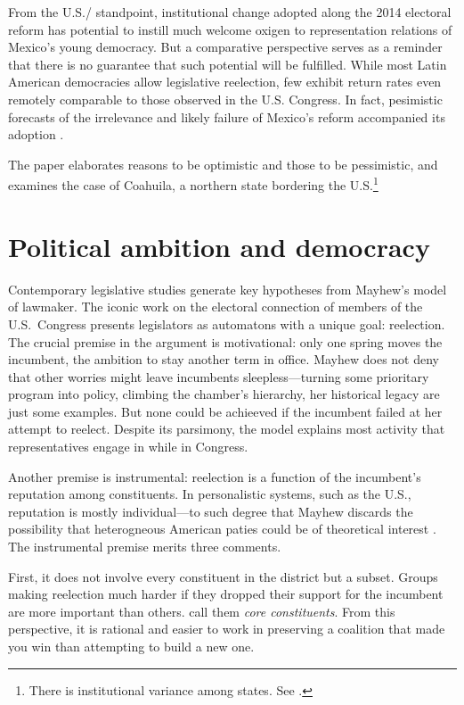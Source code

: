 \documentclass[letter,12pt]{article}
\begin{document}
From the U.S./ standpoint, institutional change adopted along the 2014 electoral reform has potential to instill much welcome oxigen to representation relations of Mexico's young democracy. But a comparative perspective serves as a reminder that there is no guarantee that such potential will be fulfilled. While most Latin American democracies allow legislative reelection, few exhibit return rates even remotely comparable to those observed in the U.S. Congress. In fact, pesimistic forecasts of the irrelevance and likely failure of Mexico's reform accompanied its adoption \citep{merinoFierroZarkin2013Blog}. 

The paper elaborates reasons to be optimistic and those to be pessimistic, and examines the case of Coahuila, a northern state bordering the U.S.\footnote{There is institutional variance among states. See \citet{magarInstReel.2017}.}

\section{Political ambition and democracy}

\noindent Contemporary legislative studies generate key hypotheses from Mayhew's \citeyearpar{mayhew.1974} model of lawmaker. The iconic work on the electoral connection of members of the U.S.\ Congress presents legislators as automatons with a unique goal: reelection. The crucial premise in the argument is motivational: only one spring moves the incumbent, the ambition to stay another term in office. Mayhew does not deny that other worries might leave incumbents sleepless---turning some prioritary program into policy, climbing the chamber's hierarchy, her historical legacy are just some examples. But none could be achieeved if the incumbent failed at her attempt to reelect. Despite its parsimony, the model explains most activity that representatives engage in while in Congress. 

Another premise is instrumental: reelection is a function of the incumbent's reputation among constituents. In personalistic systems, such as the U.S., reputation is mostly individual---to such degree that Mayhew discards the possibility that heterogneous American paties could be of theoretical interest \citep[but revisionists rescued party relevance in Myhew's framework,][]{cox.mccubbins.1993,aldrich.1995}. The instrumental premise merits three comments. 

First, it does not involve every constituent in the district but a subset. Groups making reelection much harder if they dropped their support for the incumbent are more important than others. \citet{cox.mccubbins.1986} call them \emph{core constituents}. From this perspective, it is rational and easier to work in preserving a coalition that made you win than attempting to build a new one.
\end{document}
